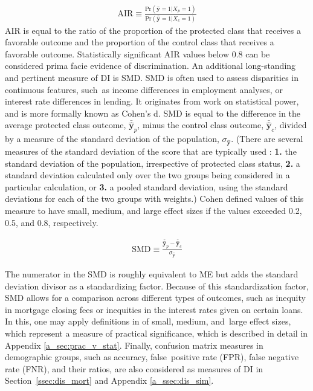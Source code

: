 \documentclass[information,article,accept,moreauthors,pdftex]{Definitions/mdpi}
\begin{document}
\begin{equation}
\label{eq:air}
\begin{aligned}
\text{AIR} \equiv \frac{\text{Pr}(\hat{\mathbf{y}} = 1 | X_p = 1)}{\text{Pr}(\hat{\mathbf{y}} = 1| X_c = 1)}
\end{aligned}
\end{equation}
 AIR is equal to the ratio of the proportion of the protected class that receives a favorable outcome and the proportion of the control class that receives a favorable outcome. Statistically significant AIR values below 0.8 can be considered {prima facie} evidence of discrimination. An additional long-standing and pertinent measure of DI is SMD. SMD is often used to assess disparities in continuous features, such~as income differences in employment analyses, or interest rate differences in lending. It originates from work on statistical power, and is more formally known as {Cohen’s d}. SMD is equal to the difference in the average protected class outcome, $\bar{\hat{\mathbf{y}}}_p$, minus the control class outcome, $\bar{\hat{\mathbf{y}}}_c$, divided by a measure of the standard deviation of the population, $\sigma_{\hat{\mathbf{y}}}$. ({{There are several measures of the standard deviation of the score that are typically used}%
: \textbf{{1}.} the standard deviation of the population, irrespective of protected class status, \textbf{{2}.} a standard deviation calculated only over the two groups being considered in a particular calculation, or \textbf{{3}.} a pooled standard deviation, using the standard deviations for each of the two groups with weights.}) Cohen defined values of this measure to have {small}, {medium}, and {large} effect sizes if the values exceeded 0.2, 0.5, and 0.8, respectively. %

\begin{equation}
\label{eq:smd}
\begin{aligned}
\text{SMD} \equiv \frac{\bar{\hat{\mathbf{y}}}_p - \bar{\hat{\mathbf{y}}}_c}{ \sigma_{\hat{\mathbf{y}}}}
\end{aligned}
\end{equation}

 The numerator in the SMD is roughly equivalent to ME but adds the standard deviation divisor as a standardizing factor.  Because of this standardization factor, SMD allows for a comparison across different types of outcomes, such as inequity in mortgage closing fees or inequities in the interest rates given on certain loans.  In this, one may apply definitions in \citet{cohen1988statistical} of {small}, {medium}, and~{large} effect sizes, which represent a measure of {practical significance}, which is described in detail in Appendix \ref{a_sec:prac_v_stat}. Finally, confusion matrix measures in demographic groups, such as accuracy, false~positive rate (FPR), false negative rate (FNR), and their ratios, are also considered as measures of DI in Section~\ref{ssec:dis_mort} and Appendix \ref{a_ssec:dis_sim}.
\end{document}
